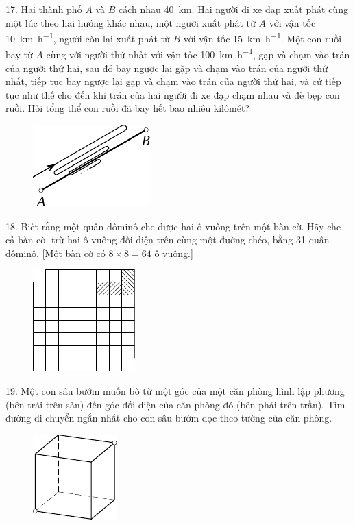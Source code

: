 \begin{problem}{17.}
	Hai thành phố $A$ và $B$ cách nhau \SI{40}{\km}. Hai người đi xe đạp xuất phát cùng một lúc theo hai hướng khác nhau, một người xuất phát từ $A$ với vận tốc \SI{10}{\km\per\hour}, người còn lại xuất phát từ $B$ với vận tốc \SI{15}{\km\per\hour}. Một con ruồi bay từ $A$ cùng với người thứ nhất với vận tốc \SI{100}{\km\per\hour}, gặp và chạm vào trán của người thứ hai, sau đó bay ngược lại gặp và chạm vào trán của người thứ nhất, tiếp tục bay ngược lại gặp và chạm vào trán của người thứ hai, và cứ tiếp tục như thế cho đến khi trán của hai người đi xe đạp chạm nhau và đè bẹp con ruồi. Hỏi tổng thể con ruồi đã bay hết bao nhiêu kilômét?
	\begin{figure}
		\includegraphics{taskbook-1}
	\end{figure}
\end{problem}

\begin{problem}{18.}
	Biết rằng một quân đôminô che được hai ô vuông trên một bàn cờ. Hãy che cả bàn cờ, trừ hai ô vuông đối diện trên cùng một đường chéo, bằng 31 quân đôminô. [Một bàn cờ có $8\times 8 = 64$ ô vuông.]
	\begin{figure}
		\includegraphics{taskbook-2}
	\end{figure}
\end{problem}

\begin{problem}{19.}
	Một con sâu bướm muốn bò từ một góc của một căn phòng hình lập phương (bên trái trên sàn) đến góc đối diện của căn phòng đó (bên phải trên trần). Tìm đường di chuyển ngắn nhất cho con sâu bướm dọc theo tường của căn phòng.

	\begin{figure}
		\includegraphics{taskbook-3}
	\end{figure}
\end{problem}

